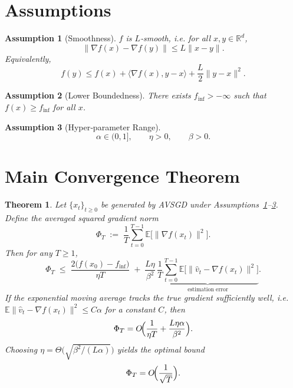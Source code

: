 \documentclass{article}
\newtheorem{theorem}{Theorem}
\newtheorem{assumption}{Assumption}
\begin{document}
\section*{Assumptions}
\begin{assumption}[Smoothness]\label{as:smooth}
$f$ is $L$‑smooth, i.e. for all $x,y\in\mathbb{R}^d$,
\[
    \|\nabla f(x)-\nabla f(y)\|\le L\|x-y\|.
\]
Equivalently,
\[
    f(y)\le f(x)+\langle\nabla f(x),y-x\rangle+\frac{L}{2}\|y-x\|^2 .
\]
\end{assumption}
\begin{assumption}[Lower Boundedness]\label{as:lb}
There exists $f_{\inf}>-\infty$ such that $f(x)\ge f_{\inf}$ for all $x$.
\end{assumption}
\begin{assumption}[Hyper‑parameter Range]\label{as:params}
\[
    \alpha\in(0,1],\qquad \eta>0,\qquad \beta>0.
\]
\end{assumption}

\section*{Main Convergence Theorem}
\begin{theorem}\label{thm:main}
Let $\{x_t\}_{t\ge0}$ be generated by AVSGD under Assumptions~\ref{as:smooth}–\ref{as:params}.
Define the averaged squared gradient norm
\[
    \Phi_T\;:=\;\frac{1}{T}\sum_{t=0}^{T-1}\mathbb{E}\bigl[\|\nabla f(x_t)\|^2\bigr].
\]
Then for any $T\ge1$,
\begin{equation}
    \Phi_T\;\le\;
    \frac{2\bigl(f(x_0)-f_{\inf}\bigr)}{\eta T}
    \;+\;
    \frac{L\eta}{\beta^2}\,
    \underbrace{\frac{1}{T}\sum_{t=0}^{T-1}
    \mathbb{E}\bigl[\|\hat v_t-\nabla f(x_t)\|^2\bigr]}_{\displaystyle\text{estimation error}} .
    \label{eq:rate}
\end{equation}
If the exponential moving average tracks the true gradient sufficiently well,
i.e. $\mathbb{E}\|\hat v_t-\nabla f(x_t)\|^2\le C\alpha$ for a constant $C$, then
\[
    \Phi_T = O\!\Bigl(\frac{1}{\eta T}+\frac{L\eta\alpha}{\beta^2}\Bigr).
\]
Choosing $\eta=\Theta\bigl(\sqrt{\beta^2/ (L\alpha)}\bigr)$ yields the optimal bound
\[
    \Phi_T = O\!\Bigl(\frac{1}{\sqrt{T}}\Bigr).
\]
\end{theorem}
\end{document}
